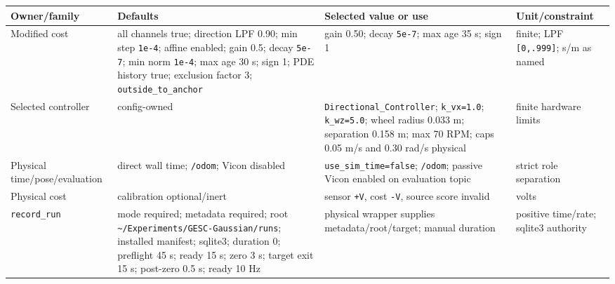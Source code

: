 \documentclass[
  10pt,
  letterpaper,
]{article}
\newcounter{none} %
\begin{document}
{\def\LTcaptype{none} %
\begin{longtable}[]{@{}
  >{\raggedright\arraybackslash}p{}
  >{\raggedright\arraybackslash}p{}
  >{\raggedright\arraybackslash}p{}
  >{\raggedright\arraybackslash}p{}@{}}
\toprule\noalign{}
\begin{minipage}[b]{\linewidth}\raggedright
Owner/family
\end{minipage} & \begin{minipage}[b]{\linewidth}\raggedright
Defaults
\end{minipage} & \begin{minipage}[b]{\linewidth}\raggedright
Selected value or use
\end{minipage} & \begin{minipage}[b]{\linewidth}\raggedright
Unit/constraint
\end{minipage} \\
\midrule\noalign{}
\endhead
\bottomrule\noalign{}
\endlastfoot
Modified cost & all channels true; direction LPF 0.90; min step \nolinkurl{1e-4}; affine enabled; gain 0.5; decay \nolinkurl{5e-7}; min norm \nolinkurl{1e-4}; max age 30 s; sign 1; PDE history true; exclusion factor 3; \nolinkurl{outside\_to\_anchor} & gain 0.50; decay \nolinkurl{5e-7}; max age 35 s; sign 1 & finite; LPF \nolinkurl{[0,.999]}; s/m as named \\
Selected controller & config-owned & \nolinkurl{Directional\_Controller}; \nolinkurl{k\_vx=1.0}; \nolinkurl{k\_wz=5.0}; wheel radius 0.033 m; separation 0.158 m; max 70 RPM; caps 0.05 m/s and 0.30 rad/s physical & finite hardware limits \\
Physical time/pose/evaluation & direct wall time; \nolinkurl{/odom}; Vicon disabled & \nolinkurl{use\_sim\_time=false}; \nolinkurl{/odom}; passive Vicon enabled on evaluation topic & strict role separation \\
Physical cost & calibration optional/inert & sensor \texttt{+V}, cost \texttt{-V}, source score invalid & volts \\
\nolinkurl{record\_run} & mode required; metadata required; root \nolinkurl{\~/Experiments/GESC-Gaussian/runs}; installed manifest; sqlite3; duration 0; preflight 45 s; ready 15 s; zero 3 s; target exit 15 s; post-zero 0.5 s; ready 10 Hz & physical wrapper supplies metadata/root/target; manual duration & positive time/rate; sqlite3 authority \\

\end{longtable}}
\end{document}
